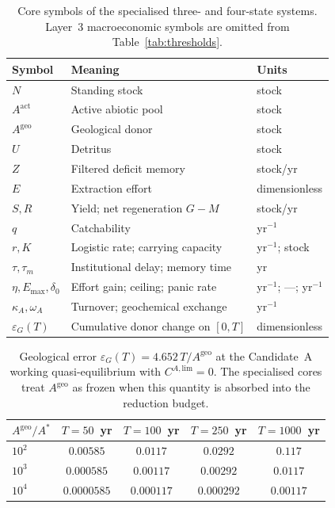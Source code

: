 \documentclass[11pt]{article}
\theoremstyle{definition}
\begin{document}
\begin{table}[h]
\centering\small
\caption{Core symbols of the specialised three- and four-state systems. Layer~3 macroeconomic symbols are omitted from Table~\ref{tab:thresholds}.}
\label{tab:glossary}
\begin{tabular}{lll}
\toprule
Symbol & Meaning & Units \\
\midrule
$N$ & Standing stock & stock \\
$A^{\mathrm{act}}$ & Active abiotic pool & stock \\
$A^{\mathrm{geo}}$ & Geological donor & stock \\
$U$ & Detritus & stock \\
$Z$ & Filtered deficit memory & stock/yr \\
$E$ & Extraction effort & dimensionless \\
$S,R$ & Yield; net regeneration $G-M$ & stock/yr \\
$q$ & Catchability & yr$^{-1}$ \\
$r,K$ & Logistic rate; carrying capacity & yr$^{-1}$; stock \\
$\tau,\tau_m$ & Institutional delay; memory time & yr \\
$\eta,E_{\max},\delta_0$ & Effort gain; ceiling; panic rate & yr$^{-1}$; ---; yr$^{-1}$ \\
$\kappa_A,\omega_A$ & Turnover; geochemical exchange & yr$^{-1}$ \\
$\varepsilon_G(T)$ & Cumulative donor change on $[0,T]$ & dimensionless \\
\bottomrule
\end{tabular}
\end{table}

\begin{table}[h]
\centering\small
\caption{Geological error $\varepsilon_G(T)=4.652\,T/A^{\mathrm{geo}}$ at the Candidate~A working quasi-equilibrium with $C^{A,\mathrm{lim}}=0$. The specialised cores treat $A^{\mathrm{geo}}$ as frozen when this quantity is absorbed into the reduction budget.}
\label{tab:epsG}
\begin{tabular}{lcccc}
\toprule
$A^{\mathrm{geo}}/A^*$ & $T=50$~yr & $T=100$~yr & $T=250$~yr & $T=1000$~yr \\
\midrule
$10^2$ & $0.00585$ & $0.0117$ & $0.0292$ & $0.117$ \\
$10^3$ & $0.000585$ & $0.00117$ & $0.00292$ & $0.0117$ \\
$10^4$ & $0.0000585$ & $0.000117$ & $0.000292$ & $0.00117$ \\
\bottomrule
\end{tabular}
\end{table}
\end{document}
